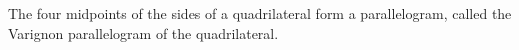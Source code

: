 The four midpoints of the sides of a quadrilateral form a parallelogram,
called the Varignon parallelogram of the quadrilateral.